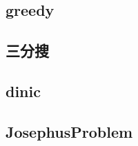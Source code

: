     \subsection{greedy}
         \columnbreak
    \subsection{三分搜}
         \columnbreak
    \subsection{dinic}
         \columnbreak
    \subsection{JosephusProblem}
        
